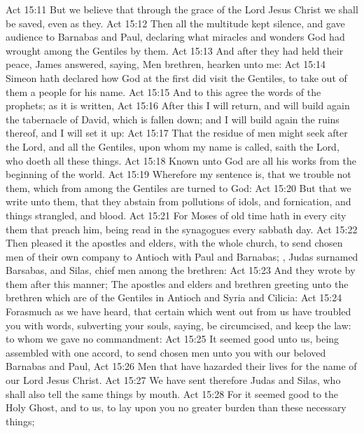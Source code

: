 \vs Act 15:11 But we believe that through the grace of the Lord Jesus Christ we shall be saved, even as they.
\vs Act 15:12 Then all the multitude kept silence, and gave audience to Barnabas and Paul, declaring what miracles and wonders God had wrought among the Gentiles by them.
\vs Act 15:13 And after they had held their peace, James answered, saying, Men  brethren, hearken unto me:
\vs Act 15:14 Simeon hath declared how God at the first did visit the Gentiles, to take out of them a people for his name.
\vs Act 15:15 And to this agree the words of the prophets; as it is written,
\vs Act 15:16 After this I will return, and will build again the tabernacle of David, which is fallen down; and I will build again the ruins thereof, and I will set it up:
\vs Act 15:17 That the residue of men might seek after the Lord, and all the Gentiles, upon whom my name is called, saith the Lord, who doeth all these things.
\vs Act 15:18 Known unto God are all his works from the beginning of the world.
\vs Act 15:19 Wherefore my sentence is, that we trouble not them, which from among the Gentiles are turned to God:
\vs Act 15:20 But that we write unto them, that they abstain from pollutions of idols, and  fornication, and  things strangled, and  blood.
\vs Act 15:21 For Moses of old time hath in every city them that preach him, being read in the synagogues every sabbath day.
\vs Act 15:22 Then pleased it the apostles and elders, with the whole church, to send chosen men of their own company to Antioch with Paul and Barnabas; , Judas surnamed Barsabas, and Silas, chief men among the brethren:
\vs Act 15:23 And they wrote  by them after this manner; The apostles and elders and brethren  greeting unto the brethren which are of the Gentiles in Antioch and Syria and Cilicia:
\vs Act 15:24 Forasmuch as we have heard, that certain which went out from us have troubled you with words, subverting your souls, saying,  be circumcised, and keep the law: to whom we gave no  commandment:
\vs Act 15:25 It seemed good unto us, being assembled with one accord, to send chosen men unto you with our beloved Barnabas and Paul,
\vs Act 15:26 Men that have hazarded their lives for the name of our Lord Jesus Christ.
\vs Act 15:27 We have sent therefore Judas and Silas, who shall also tell  the same things by mouth.
\vs Act 15:28 For it seemed good to the Holy Ghost, and to us, to lay upon you no greater burden than these necessary things;
